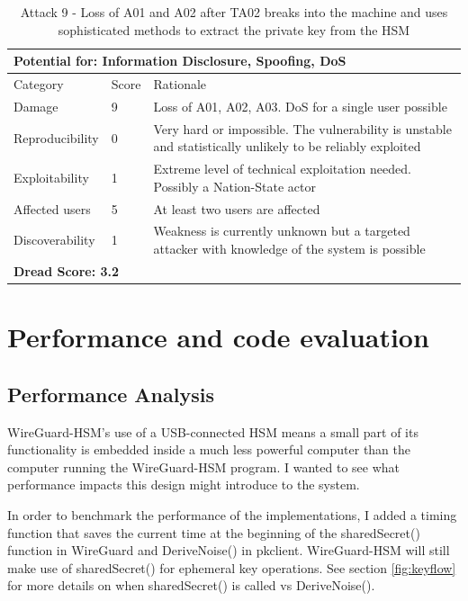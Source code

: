 \documentclass [11pt, proquest] {uwthesis}[2020/02/24]
\begin{document}
\begin{table}[H]
\label{attack9-hsm}
\begin{tabular}{|m{3cm}|m{.9cm}|p{27em} |}
\multicolumn{3}{l}{Potential for: Information Disclosure, Spoofing, DoS}                   \\
\hline
Category & Score & Rationale \\
\hline
Damage          & 9     & Loss of A01, A02, A03. DoS for a single user possible            \\
\hline
Reproducibility & 0     & Very hard or impossible. The vulnerability is unstable and statistically unlikely to be reliably exploited   \\
\hline
Exploitability & 1      & Extreme level of technical exploitation needed. Possibly a Nation-State actor   \\
\hline
Affected users  & 5     & At least two users are affected                      \\
\hline
Discoverability & 1     & Weakness is currently unknown but a targeted attacker with knowledge of the system is possible   \\
\hline
\multicolumn{3}{l}{\textbf{Dread Score: 3.2}} 
\end{tabular}
\caption{Attack 9 - Loss of A01 and A02 after TA02 breaks into the machine and uses sophisticated methods to extract the private key from the HSM }
\end{table}


\chapter{Performance and code evaluation}
\section{Performance Analysis}

\label{performance}
WireGuard-HSM's use of a USB-connected HSM means a small part of its functionality is embedded inside a much less powerful computer than the computer running the WireGuard-HSM program. I wanted to see what performance impacts this design might introduce to the system. 

In order to benchmark the performance of the implementations, I added a timing function that saves the current time at the beginning of the sharedSecret() function in WireGuard and DeriveNoise() in pkclient. WireGuard-HSM will still make use of sharedSecret() for ephemeral key operations.
See section \ref{fig:keyflow} for more details on when sharedSecret() is called vs DeriveNoise().
\end{document}
